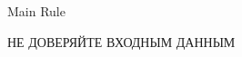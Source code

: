 \begin{frame}{Main Rule}
  \LARGE
  \begin{center}
    НЕ ДОВЕРЯЙТЕ ВХОДНЫМ ДАННЫМ
  \end{center}
\end{frame}